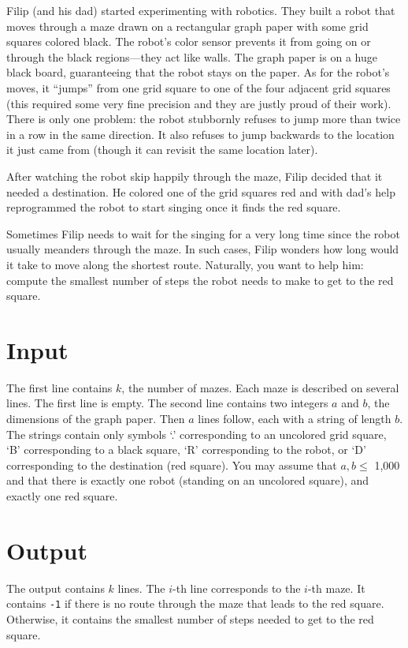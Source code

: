 
Filip (and his dad) started experimenting with robotics. They built a robot that moves through a maze drawn on a rectangular graph paper with some grid squares colored black. The robot's color sensor prevents it from going on or through the black regions---they act like walls. The graph paper is on a huge black board, guaranteeing that the robot stays on the paper. As for the robot's moves, it ``jumps'' from one grid square to one of the four adjacent grid squares (this required some very fine precision and they are justly proud of their work). There is only one problem: the robot stubbornly refuses to jump more than twice in a row in the same direction. It also refuses to jump backwards to the location it just came from (though it can revisit the same location later).

After watching the robot skip happily through the maze, Filip decided that it needed a destination. He colored one of the grid squares red and with dad's help reprogrammed the robot to start singing once it finds the red square.

Sometimes Filip needs to wait for the singing for a very long time since the robot usually meanders through the maze. In such cases, Filip wonders how long would it take to move along the shortest route. Naturally, you want to help him: compute the smallest number of steps the robot needs to make to get to the red square.


\section*{Input}
The first line contains $k$, the number of mazes.
Each maze is described on several lines. The first line is empty. The second line contains two integers $a$ and $b$, the dimensions of the graph paper. Then $a$ lines follow, each with a string of length $b$. The strings contain only symbols `.' corresponding to an uncolored grid square, `B' corresponding to a black square, `R' corresponding to the robot, or `D' corresponding to the destination (red square). You may assume that $a,b\leq$ 1,000 and that there is exactly one robot (standing on an uncolored square), and exactly one red square.


\section*{Output}
The output contains $k$ lines. The $i$-th line corresponds to the $i$-th maze.
It contains {\tt -1} if there is no route through the maze that leads to the red square.
Otherwise, it contains the smallest number of steps needed to get to the red square.



